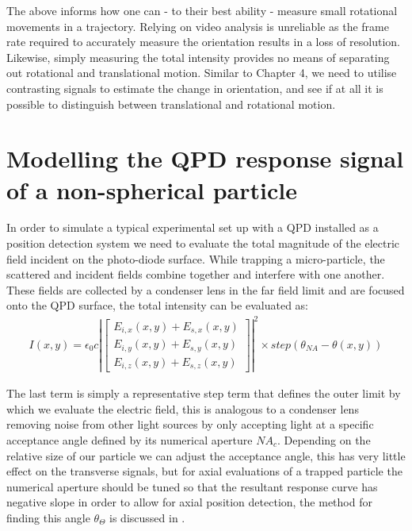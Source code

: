 The above informs how one can - to their best ability - measure small 
rotational movements in a trajectory. Relying on video analysis is 
unreliable as the frame rate required to accurately measure the 
orientation results in a loss of resolution. Likewise, simply measuring
the total intensity provides no means of separating out rotational and 
translational motion. Similar to Chapter 4, we need to utilise contrasting signals to estimate the change in orientation, and see if at all it is possible to distinguish between translational and rotational motion.


\section{Modelling the QPD response signal of a non-spherical particle}
In order to simulate a typical experimental set up with a QPD 
installed as a position detection system we need to evaluate 
the total magnitude of the electric field incident on the 
photo-diode surface. While trapping a micro-particle, the 
scattered and incident fields combine together and interfere 
with one another. These fields are collected by a condenser 
lens in the far field limit and are focused onto the QPD 
surface, the total intensity can be evaluated as:
\begin{align}
	I(x,y) = \epsilon_0c\left|
	\begin{bmatrix} 
		E_{i,x}(x,y)+E_{s,x}(x,y) \\ 
		E_{i,y}(x,y)+E_{s,y}(x,y) \\ 
		E_{i,z}(x,y)+E_{s,z}(x,y)
	\end{bmatrix} \right|^2 \times step(\theta_{NA}-\theta(x,y))
\end{align}

The last term is simply a representative step term that defines 
the outer limit by which we evaluate the electric field, this is 
analogous to a condenser lens removing noise from other light 
sources by only accepting light at a specific acceptance angle 
defined by its numerical aperture $NA_c$. Depending on the 
relative size of our particle we can adjust the acceptance angle, 
this has very little effect on the transverse signals, but for 
axial evaluations of a trapped particle the numerical aperture 
should be tuned so that the resultant response curve has negative 
slope in order to allow for axial position detection, the method 
for finding this angle $\theta_\Theta$ is discussed in 
\cite{Friedrich2012}.

